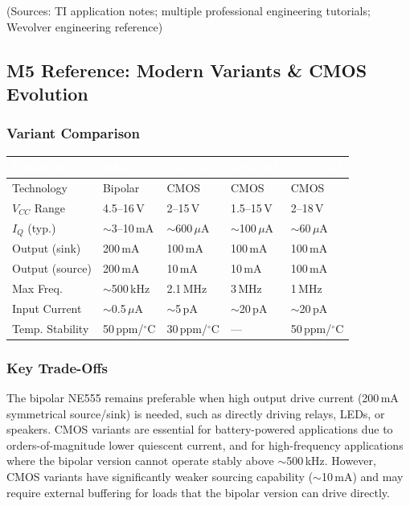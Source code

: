 \documentclass[11pt,letterpaper]{article}
\newcommand{\tableheader}[1]{\textbf{\sffamily\textcolor{white}{#1}}}
\begin{document}
(Sources: TI application notes; multiple professional engineering tutorials; Wevolver engineering reference)

\subsection{M5 Reference: Modern Variants \& CMOS Evolution}

\subsubsection{Variant Comparison}

\begin{center}
\begin{tabularx}{\textwidth}{L{2cm}C{2cm}C{2cm}C{2cm}C{2cm}}
\toprule
{}
\tableheader{Parameter} & \tableheader{NE555} & \tableheader{TLC555} & \tableheader{LMC555} & \tableheader{ICM7555} \\
\midrule
Technology & Bipolar & CMOS & CMOS & CMOS \\
$V_{CC}$ Range & 4.5--16\,V & 2--15\,V & 1.5--15\,V & 2--18\,V \\
$I_Q$ (typ.) & $\sim$3--10\,mA & $\sim$600\,$\mu$A & $\sim$100\,$\mu$A & $\sim$60\,$\mu$A \\
Output (sink) & 200\,mA & 100\,mA & 100\,mA & 100\,mA \\
Output (source) & 200\,mA & 10\,mA & 10\,mA & 100\,mA \\
Max Freq. & $\sim$500\,kHz & 2.1\,MHz & 3\,MHz & 1\,MHz \\
Input Current & $\sim$0.5\,$\mu$A & $\sim$5\,pA & $\sim$20\,pA & $\sim$20\,pA \\
Temp. Stability & 50\,ppm/$^{\circ}$C & 30\,ppm/$^{\circ}$C & --- & 50\,ppm/$^{\circ}$C \\
\bottomrule
\end{tabularx}
\end{center}

\subsubsection{Key Trade-Offs}

The bipolar NE555 remains preferable when high output drive current (200\,mA symmetrical source/sink) is needed, such as directly driving relays, LEDs, or speakers. CMOS variants are essential for battery-powered applications due to orders-of-magnitude lower quiescent current, and for high-frequency applications where the bipolar version cannot operate stably above $\sim$500\,kHz. However, CMOS variants have significantly weaker sourcing capability ($\sim$10\,mA) and may require external buffering for loads that the bipolar version can drive directly.
\end{document}

